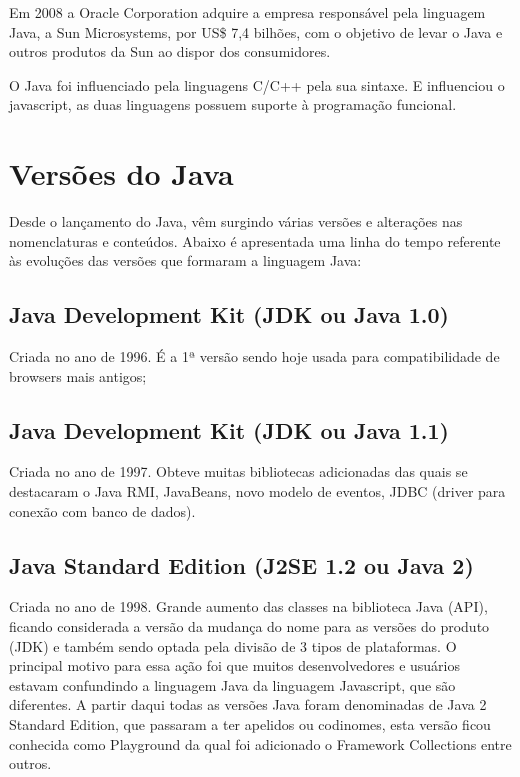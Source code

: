 \documentclass[
	12pt,				%
	openright,			%
	oneside,			%
	a4paper,			%
	english,			%
	french,				%
	spanish,			%
	brazil				%
	]{abntex2}
\begin{document}
Em 2008 a Oracle Corporation adquire a empresa responsável pela linguagem Java, a Sun Microsystems, por US\$ 7,4 bilhões, com o objetivo de levar o Java e outros produtos da Sun ao dispor dos consumidores.

O Java foi influenciado pela linguagens C/C++ pela sua sintaxe. E influenciou o javascript, as duas linguagens possuem suporte à programação funcional.

\section{Versões do Java}

Desde o lançamento do Java, vêm surgindo várias versões e alterações nas nomenclaturas e conteúdos. Abaixo é apresentada uma linha do tempo referente às evoluções das versões que formaram a linguagem Java:

\subsection{Java Development Kit (JDK ou Java 1.0)}

Criada no ano de 1996.
É a 1ª versão sendo hoje usada para compatibilidade de browsers mais antigos;

\subsection{Java Development Kit (JDK ou Java 1.1)}

Criada no ano de 1997.
Obteve muitas bibliotecas adicionadas das quais se destacaram o Java RMI, JavaBeans, novo modelo de eventos, JDBC (driver para conexão com banco de dados).

\subsection{Java Standard Edition (J2SE 1.2 ou Java 2)}

Criada no ano de 1998.
Grande aumento das classes na biblioteca Java (API), ficando considerada a versão da mudança do nome para as versões do produto (JDK) e também sendo optada pela divisão de 3 tipos de plataformas. O principal motivo para essa ação foi que muitos desenvolvedores e usuários estavam confundindo a linguagem Java da linguagem Javascript, que são diferentes. A partir daqui todas as versões Java foram denominadas de Java 2 Standard Edition, que passaram a ter apelidos ou codinomes, esta versão ficou conhecida como Playground da qual foi adicionado o Framework Collections entre outros.
\end{document}
